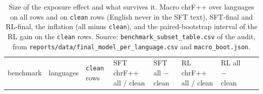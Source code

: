 \begin{table}[t]
\centering
\scriptsize
\setlength{\tabcolsep}{3pt}
\caption{Size of the exposure effect and what survives it. Macro chrF++ over languages on all rows and on \texttt{clean} rows (English never in the SFT text), SFT-final and RL-final, the inflation (all minus \texttt{clean}), and the paired-bootstrap interval of the RL gain on the \texttt{clean} rows. Source: \texttt{benchmark\_subset\_table.csv} of the audit, from \texttt{reports/data/final\_model\_per\_language.csv} and \texttt{macro\_boot.json}.}
\label{tab:t_exposure_size}
{\def\LTcaptype{none} %
\begin{tabular}{@{}
  >{\raggedright\arraybackslash}p{}
  >{\raggedleft\arraybackslash}p{}
  >{\raggedleft\arraybackslash}p{}
  >{\raggedleft\arraybackslash}p{}
  >{\raggedleft\arraybackslash}p{}
  >{\raggedleft\arraybackslash}p{}
  >{\raggedleft\arraybackslash}p{}
  >{\raggedleft\arraybackslash}p{}
  >{\raggedleft\arraybackslash}p{}@{}}
\toprule
\begin{minipage}[b]{\linewidth}\raggedright
benchmark
\end{minipage} & \begin{minipage}[b]{\linewidth}\raggedleft
languages
\end{minipage} & \begin{minipage}[b]{\linewidth}\raggedleft
\texttt{clean} rows
\end{minipage} & \begin{minipage}[b]{\linewidth}\raggedleft
SFT chrF++ all / clean
\end{minipage} & \begin{minipage}[b]{\linewidth}\raggedleft
SFT all \(-\) clean
\end{minipage} & \begin{minipage}[b]{\linewidth}\raggedleft
RL chrF++ all / clean
\end{minipage} & \begin{minipage}[b]{\linewidth}\raggedleft
RL all \(-\) clean
\end{minipage} & \begin{minipage}[b]{\linewidth}\raggedleft

\end{minipage}
\end{tabular}}
\end{table}

